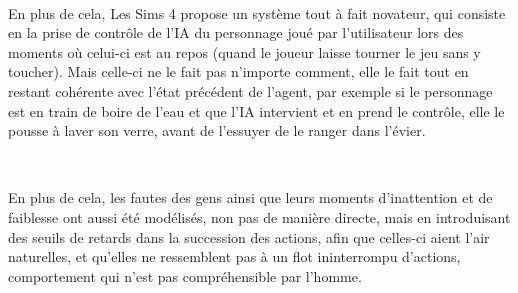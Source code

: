 ~\par
En plus de cela, Les Sims 4 propose un système tout à fait novateur, qui consiste en la prise de contrôle de l’IA du personnage joué par l’utilisateur lors des moments où celui-ci est au repos (quand le joueur laisse tourner le jeu sans y toucher). Mais celle-ci ne le fait pas n’importe comment, elle le fait tout en restant cohérente avec l’état précédent de l’agent, par exemple si le personnage est en train de boire de l’eau et que l’IA intervient et en prend le contrôle, elle le pousse à laver son verre, avant de l'essuyer de le ranger dans l’évier.

~\par
En plus de cela, les fautes des gens ainsi que leurs moments d'inattention et de faiblesse ont aussi été modélisés, non pas de manière directe, mais en introduisant des seuils de retards dans la succession des actions, afin que celles-ci aient l’air naturelles, et qu’elles ne ressemblent pas à un flot ininterrompu d’actions, comportement  qui n’est pas compréhensible par l’homme.
